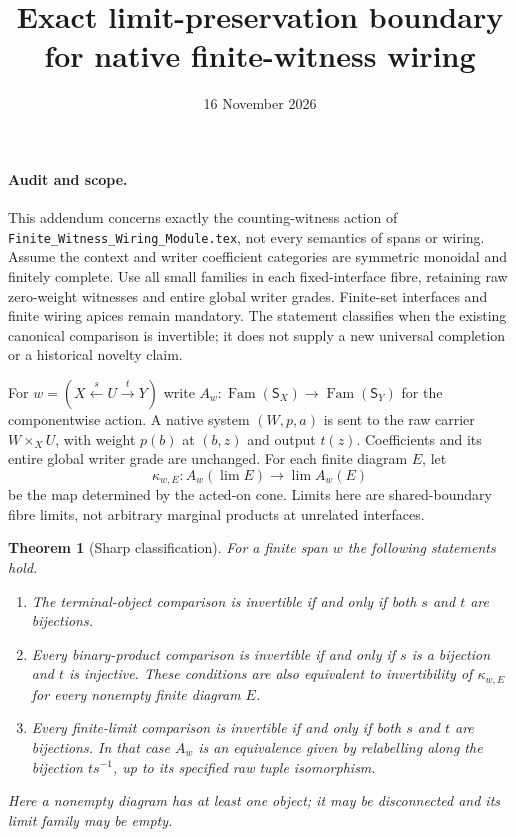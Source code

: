 \documentclass{article}
\title{Exact limit-preservation boundary for native finite-witness wiring}
\date{16 November 2026}
\newtheorem{theorem}{Theorem}
\begin{document}
\maketitle
\paragraph{Audit and scope.}
This addendum concerns exactly the counting-witness action of
\texttt{Finite\_Witness\_Wiring\_Module.tex}, not every semantics of spans or
wiring. Assume the context and writer coefficient categories are symmetric
monoidal and finitely complete. Use all small families in each fixed-interface
fibre, retaining raw zero-weight witnesses and entire global writer grades.
Finite-set interfaces and finite wiring apices remain mandatory. The statement
classifies when the existing canonical comparison is invertible; it does not
supply a new universal completion or a historical novelty claim.

For $w=(X\xleftarrow{s}U\xrightarrow{t}Y)$ write
$A_w:\operatorname{Fam}(\mathsf S_X)\to\operatorname{Fam}(\mathsf S_Y)$
for the componentwise action. A native system $(W,p,a)$ is sent to the raw
carrier $W\times_XU$, with weight $p(b)$ at $(b,z)$ and output $t(z)$.
Coefficients and its entire global writer grade are unchanged. For each finite
diagram $E$, let
\[
 \kappa_{w,E}:A_w(\lim E)\longrightarrow\lim A_w(E)
\]
be the map determined by the acted-on cone. Limits here are shared-boundary
fibre limits, not arbitrary marginal products at unrelated interfaces.

\begin{theorem}[Sharp classification]
For a finite span $w$ the following statements hold.
\begin{enumerate}
\item The terminal-object comparison is invertible if and only if both $s$
and $t$ are bijections.
\item Every binary-product comparison is invertible if and only if $s$ is a
bijection and $t$ is injective. These conditions are also equivalent to
invertibility of $\kappa_{w,E}$ for every nonempty finite diagram $E$.
\item Every finite-limit comparison is invertible if and only if both $s$ and
$t$ are bijections. In that case $A_w$ is an equivalence given by relabelling
along the bijection $t s^{-1}$, up to its specified raw tuple isomorphism.
\end{enumerate}
Here a nonempty diagram has at least one object; it may be disconnected and
its limit family may be empty.
\end{theorem}
\end{document}
